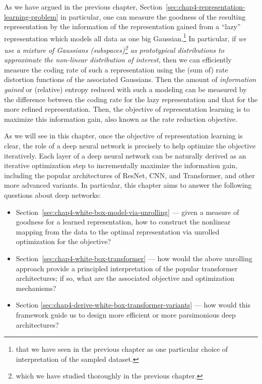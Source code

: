 \documentclass[../../book-main.tex]{subfiles}
\begin{document}
As we have argued in the previous chapter, Section~\ref{sec:chap4-representation-learning-problem} in particular, one can measure the goodness of the resulting representation by the information of the representation gained from a ``lazy'' representation which models all data as one big Gaussian.\footnote{that we have seen in the previous chapter as one particular choice of interpretation of the sampled dataset.} In particular, if \textit{we use a mixture of Gaussians (subspaces)\footnote{which we have studied thoroughly in the previous chapter.} as prototypical distributions to approximate the non-linear distribution of interest}, then we can efficiently measure the coding rate of such a representation using the (sum of) rate distortion functions of the associated Gaussians. Then the amount of {\em information gained} or (relative) entropy reduced with such a modeling can be measured by the difference between the coding rate for the lazy representation and that for the more refined representation. Then,  the objective of representation learning is to maximize this information gain, also known as the rate reduction objective. 

As we will see in this chapter, once the objective of representation learning is clear, the role of a deep neural network is precisely to help optimize the objective iteratively. Each layer of a deep neural network can be naturally derived as an iterative optimization step to incrementally maximize the information gain, including the popular architectures of ResNet, CNN, and Transformer, and other more advanced variants. In particular, this chapter aims to answer the following questions about deep networks:
\begin{itemize}
    \item Section~\ref{sec:chap4-white-box-model-via-unrolling} --- given a measure of goodness for a learned representation, how to construct the nonlinear mapping from the data to the optimal representation via unrolled optimization for the objective?
    \item Section~\ref{sec:chap4-white-box-transformer} --- how would the above unrolling approach provide a principled interpretation of the popular transformer architectures; if so, what are the associated objective and optimization mechanisms? 
    \item Section \ref{sec:chap4-derive-white-box-transformer-variants} --- how would this framework guide us to design more efficient or more parsimonious deep architectures?
\end{itemize}
\end{document}
